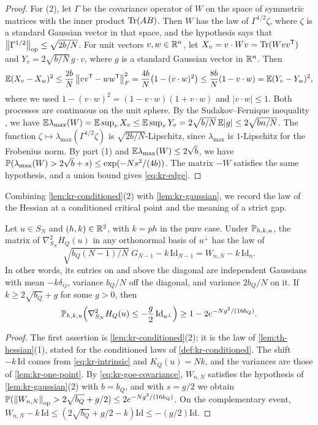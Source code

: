 \begin{proof}
For (2), let $\Gamma$ be the covariance operator of $W$ on the space of symmetric matrices with the inner product $\operatorname{Tr}(AB)$. Then $W$ has the law of $\Gamma^{1/2}\zeta$, where $\zeta$ is a standard Gaussian vector in that space, and the hypothesis says that $\left\lVert\Gamma^{1/2}\right\rVert_{\rm op}\le\sqrt{2b/N}$. For unit vectors $v,w\in\mathbb R^n$, let $X_v=v\cdot Wv=\operatorname{Tr}(Wvv^{\mathsf T})$ and $Y_v=2\sqrt{b/N}\,g\cdot v$, where $g$ is a standard Gaussian vector in $\mathbb R^n$. Then
\[
\mathbb E(X_v-X_w)^2\le\frac{2b}N\left\lVert vv^{\mathsf T}-ww^{\mathsf T}\right\rVert_F^2=\frac{4b}N\big(1-(v\cdot w)^2\big)\le\frac{8b}N(1-v\cdot w)=\mathbb E(Y_v-Y_w)^2,
\]
where we used $1-(v\cdot w)^2=(1-v\cdot w)(1+v\cdot w)$ and $|v\cdot w|\le1$. Both processes are continuous on the unit sphere. By the Sudakov--Fernique inequality \cite[Theorem~2.2.3]{AdlerTaylor2007},
we have $\mathbb E\lambda_{\max}(W)=\mathbb E\sup_vX_v\le\mathbb E\sup_vY_v=2\sqrt{b/N}\,\mathbb E|g|\le2\sqrt{bn/N}$. The function $\zeta\mapsto\lambda_{\max}(\Gamma^{1/2}\zeta)$ is $\sqrt{2b/N}$-Lipschitz, since $\lambda_{\max}$ is $1$-Lipschitz for the Frobenius norm. By part (1) and $\mathbb E\lambda_{\max}(W)\le2\sqrt b$, we have $\mathbb P(\lambda_{\max}(W)>2\sqrt b+s)\le\exp(-Ns^2/(4b))$. The matrix $-W$ satisfies the same hypothesis, and a union bound gives \eqref{eq:kr-edge}.
\end{proof}

Combining \cref{lem:kr-conditioned}(2) with \cref{lem:kr-gaussian}, we record the law of the Hessian at a conditioned critical point and the meaning of a strict gap.

\begin{corollary}\label{cor:kr-hessian}
Let $u\in S_N$ and $(h,k)\in\mathbb R^2$, with $k=ph$ in the pure case. Under $\mathbb P_{h,k,u}$, the matrix of $\nabla^2_{S_N}H_Q(u)$ in any orthonormal basis of $u^\perp$ has the law of
\[
\sqrt{b_Q(N-1)/N}\;G_{N-1}-k\,\mathrm{Id}_{N-1}=W_{n,N}-k\,\mathrm{Id}_n.
\]
In other words, its entries on and above the diagonal are independent Gaussians with mean $-k\delta_{ij}$, variance $b_Q/N$ off the diagonal, and variance $2b_Q/N$ on it. If $k\ge2\sqrt{b_Q}+g$ for some $g>0$, then
\[
\mathbb P_{h,k,u}\Big(\nabla^2_{S_N}H_Q(u)\le-\frac g2\,\mathrm{Id}_{u^\perp}\Big)\ge1-2e^{-Ng^2/(16b_Q)}.
\]
\end{corollary}

\begin{proof}
The first assertion is \cref{lem:kr-conditioned}(2); it is the law of \cref{lem:th-hessian}(1), stated for the conditioned laws of \cref{def:kr-conditioned}. The shift $-k\,\mathrm{Id}$ comes from \eqref{eq:kr-intrinsic} and $K_Q(u)=Nk$, and the variances are those of \cref{lem:kr-one-point}. By \eqref{eq:kr-goe-covariance}, $W_{n,N}$ satisfies the hypothesis of \cref{lem:kr-gaussian}(2) with $b=b_Q$, and with $s=g/2$ we obtain $\mathbb P(\left\lVert W_{n,N}\right\rVert_{\rm op}>2\sqrt{b_Q}+g/2)\le2e^{-Ng^2/(16b_Q)}$. On the complementary event, $W_{n,N}-k\,\mathrm{Id}\le(2\sqrt{b_Q}+g/2-k)\mathrm{Id}\le-(g/2)\mathrm{Id}$.
\end{proof}

